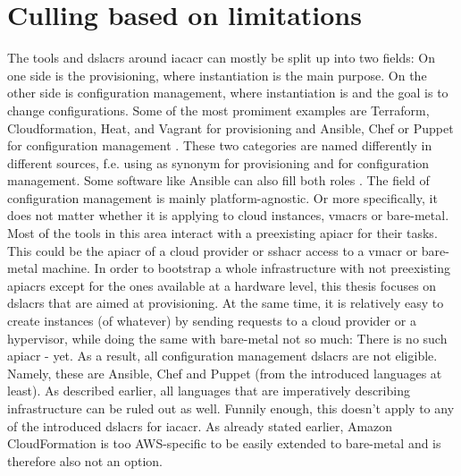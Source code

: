 \section{Culling based on limitations}
The tools and \gls{dslacr}s around \gls{iacacr} can mostly be split up into two fields: On one side is the provisioning, where instantiation is the main purpose. On the other side is configuration management, where instantiation is  and the goal is to change configurations. Some of the most promiment examples are Terraform, Cloudformation, Heat, and Vagrant for provisioning and Ansible, Chef or Puppet for configuration management \cite{iac_report} \cite{iac_oreilly} \cite{terraform_cloudformation} \cite{terraform_chef_puppet} \cite{atlassian_iac}.
\newline
These two categories are named differently in different sources, f.e. using  as synonym for provisioning and  for configuration management. Some software like Ansible can also fill both roles \cite{iac_oreilly}.
\newline
The field of configuration management is mainly platform-agnostic. Or more specifically, it does not matter whether it is applying to cloud instances, \gls{vmacr}s or bare-metal. Most of the tools in this area interact with a preexisting \gls{apiacr} for their tasks. This could be the \gls{apiacr} of a cloud provider or \gls{sshacr} access to a \gls{vmacr} or bare-metal machine.
\newline
In order to bootstrap a whole infrastructure with not preexisting \gls{apiacr}s except for the ones available at a hardware level, this thesis focuses on \gls{dslacr}s that are aimed at provisioning. At the same time, it is relatively easy to create instances (of whatever) by sending requests to a cloud provider or a hypervisor, while doing the same with bare-metal not so much: There is no such \gls{apiacr} - yet.
\newline
As a result, all configuration management \gls{dslacr}s are not eligible. Namely, these are Ansible, Chef and Puppet (from the introduced languages at least).
\newline
As described earlier, all languages that are imperatively describing infrastructure can be ruled out as well. Funnily enough, this doesn't apply to any of the introduced \gls{dslacr}s for \gls{iacacr}.
\newline
As already stated earlier, Amazon CloudFormation is too AWS-specific to be easily extended to bare-metal and is therefore also not an option.

